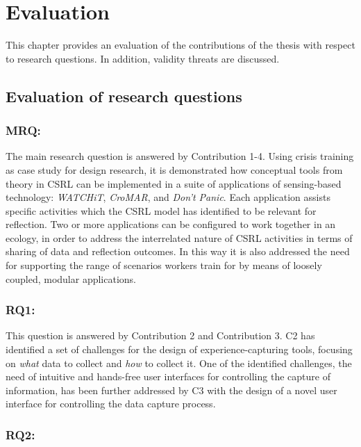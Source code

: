 \chapter{Evaluation}\label{evaluation}

This chapter provides an evaluation of the contributions of the thesis with respect to research questions. In addition, validity threats are discussed.

\section{Evaluation of research questions}\label{evaluation-of-research-questions}

\subsection{MRQ: \MRQ}\label{mrq}

The main research question is answered by Contribution 1-4. Using crisis training as case study for design research, it is demonstrated how conceptual tools from theory in CSRL can be implemented in a suite of applications of sensing-based technology: \emph{WATCHiT}, \emph{CroMAR}, and \emph{Don't Panic}. Each application assists specific activities which the CSRL model has identified to be relevant for reflection. Two or more applications can be configured to work together in an ecology, in order to address the interrelated nature of CSRL activities in terms of sharing of data and reflection outcomes. In this way it is also addressed the need for supporting the range of scenarios workers train for by means of loosely coupled, modular applications.

\subsection{RQ1: \RQi}\label{rq1}

This question is answered by Contribution 2 and Contribution 3. C2 has identified a set of challenges for the design of experience-capturing tools, focusing on \emph{what} data to collect and \emph{how} to collect it. One of the identified challenges, the need of intuitive and hands-free user interfaces for controlling the capture of information, has been further addressed by C3 with the design of a novel user interface for controlling the data capture process.

\subsection{RQ2: \RQii}\label{rq2}

